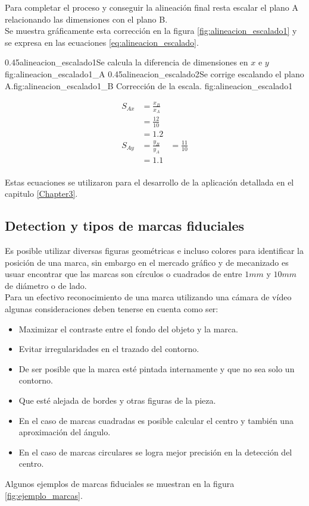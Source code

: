          Para completar el proceso y conseguir la alineación final resta escalar el plano A relacionando las dimensiones con el plano B.\\
         Se muestra gráficamente esta corrección en la figura \ref{fig:alineacion_escalado1} y se expresa en las ecuaciones  \ref{eq:alineacion_escalado}.


\subfigab
         {0.45}{alineacion_escalado1}{Se calcula la diferencia de dimensiones en $x$ e $y$}{fig:alineacion_escalado1_A}
         {0.45}{alineacion_escalado2}{Se corrige escalando el plano A.}{fig:alineacion_escalado1_B}
         {Corrección de la escala.}
         {fig:alineacion_escalado1}

         \begin{equation}
            \begin{aligned}
               S_{Ax} &= \frac{x_B}{x_A}\\
                      &= \frac{12}{10}\\
                      &= 1.2\\
               S_{Ay} &= \frac{y_B}{y_A}
                      &= \frac{11}{10}\\
                      &= 1.1\\
            \end{aligned}
            \label{eq:alineacion_escalado}
         \end{equation}

         Estas ecuaciones se utilizaron para el desarrollo de la aplicación detallada en el capitulo \ref{Chapter3}.

\subsection{Detection y tipos de marcas fiduciales}
   Es posible utilizar diversas figuras geométricas e incluso colores para identificar la posición de una marca, sin embargo en el mercado gráfico y de mecanizado es usuar encontrar que las marcas son círculos o cuadrados de entre $1mm$ y $10mm$ de diámetro o de lado.\\
   Para un efectivo reconocimiento de una marca utilizando una cámara de vídeo algunas consideraciones deben tenerse en cuenta como ser:
   \begin{itemize}
      \item{Maximizar el contraste entre el fondo del objeto y la marca.}
      \item{Evitar irregularidades en el trazado del contorno.}
      \item{De ser posible que la marca esté pintada internamente y que no sea solo un contorno.}
      \item{Que esté alejada de bordes y otras figuras de la pieza.}
      \item{En el caso de marcas cuadradas es posible calcular el centro y también una aproximación del ángulo.}
      \item{En el caso de marcas circulares se logra mejor precisión en la detección del centro.}
   \end{itemize}
   Algunos ejemplos de marcas fiduciales se muestran en la figura \ref{fig:ejemplo_marcas}.

